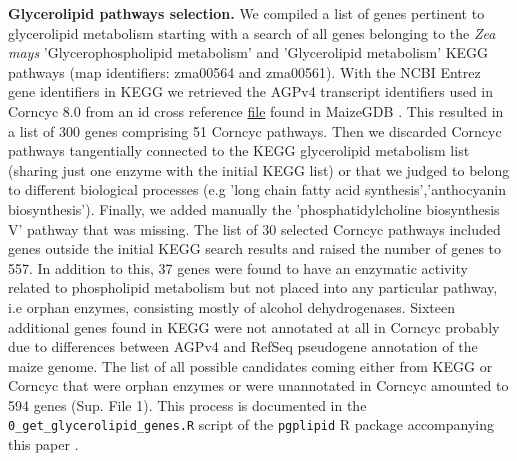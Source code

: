 \documentclass[9pt,twocolumn,twoside,lineno]{BioRxiv}
\begin{document}
\textbf{Glycerolipid pathways selection.}
We compiled a list of genes pertinent to glycerolipid metabolism starting with a search of all genes belonging to the \textit{Zea mays} 'Glycerophospholipid metabolism' and 'Glycerolipid metabolism' KEGG pathways \cite{kanehisa2019} (map identifiers: zma00564 and zma00561). 
With the NCBI Entrez gene identifiers in KEGG we retrieved the AGPv4 transcript identifiers used in Corncyc 8.0 \cite{portwood2019, walsh2016} from an id cross reference \href{https://www.maizegdb.org/search/gene/download_gene_xrefs.php?relative=v4}{file} found in MaizeGDB   \cite{portwood2019}.
This resulted in a list of 300 genes comprising 51 Corncyc pathways. 
Then we discarded Corncyc pathways  tangentially connected to the KEGG glycerolipid metabolism list (sharing just one enzyme with the initial KEGG list) or that we judged to belong to different biological processes (e.g 'long chain fatty acid synthesis','anthocyanin biosynthesis'). 
Finally, we added manually the 'phosphatidylcholine biosynthesis V' pathway that was missing. 
The list of 30 selected Corncyc pathways included genes outside the initial KEGG search results and raised the number of genes to 557. 
In addition to this, 37 genes were found to have an enzymatic activity related to phospholipid metabolism but not placed into any particular pathway, i.e orphan enzymes, consisting mostly of alcohol dehydrogenases. 
Sixteen additional genes found in KEGG were not annotated at all in Corncyc probably due to differences between AGPv4 and RefSeq pseudogene annotation of the maize genome. 
The list of all possible candidates coming either from KEGG or Corncyc that were orphan enzymes or were unannotated in Corncyc amounted to 594 genes (Sup. File 1). 
This process is documented in the \verb|0_get_glycerolipid_genes.R| script of the \verb|pgplipid| R package accompanying this paper \cite{fausto_rodriguez_zapata_2020_4323410}.
\end{document}
